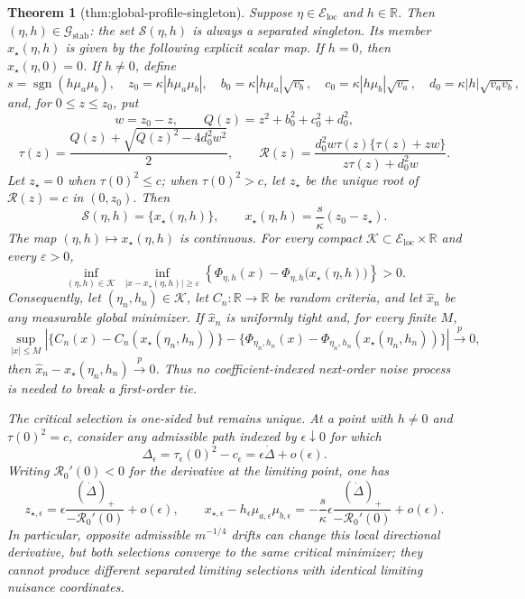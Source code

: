\documentclass{article}
\newtheorem{theorem}{Theorem}
\begin{document}
\begin{theorem}[thm:global-profile-singleton]\label{thm:global-profile-singleton}
Suppose \(\eta\in\mathcal E_{\mathrm{loc}}\) and \(h\in\mathbb R\).  Then \((\eta,h)\in\mathcal G_{\mathrm{stab}}\): the set \(\mathcal S(\eta,h)\) is always a separated singleton.  Its member \(x_\star(\eta,h)\) is given by the following explicit scalar map.  If \(h=0\), then \(x_\star(\eta,0)=0\).  If \(h\neq0\), define
\[
 s=\operatorname{sgn}(h\mu_a\mu_b),\quad
 z_0=\kappa|h\mu_a\mu_b|,\quad
 b_0=\kappa|h\mu_a|\sqrt{v_b},\quad
 c_0=\kappa|h\mu_b|\sqrt{v_a},\quad
 d_0=\kappa|h|\sqrt{v_av_b},
\]
and, for \(0\leq z\leq z_0\), put
\[
 w=z_0-z,\qquad Q(z)=z^2+b_0^2+c_0^2+d_0^2,
\]
\[
 \tau(z)=\frac{Q(z)+\sqrt{Q(z)^2-4d_0^2w^2}}{2},\qquad
 \mathcal R(z)=\frac{d_0^2w\tau(z)\{\tau(z)+zw\}}
 {z\tau(z)+d_0^2w}.
\]
Let \(z_\star=0\) when \(\tau(0)^2\leq c\); when \(\tau(0)^2>c\), let \(z_\star\) be the unique root of \(\mathcal R(z)=c\) in \((0,z_0)\).  Then
\[
 \mathcal S(\eta,h)=\{x_\star(\eta,h)\},\qquad
 x_\star(\eta,h)=\frac{s}{\kappa}(z_0-z_\star).
\]
The map \((\eta,h)\mapsto x_\star(\eta,h)\) is continuous.  For every compact \(\mathcal K\subset\mathcal E_{\mathrm{loc}}\times\mathbb R\) and every \(\varepsilon>0\),
\[
 \inf_{(\eta,h)\in\mathcal K}\ \inf_{|x-x_\star(\eta,h)|\geq\varepsilon}
 \left\{\Phi_{\eta,h}(x)-\Phi_{\eta,h}\bigl(x_\star(\eta,h)\bigr)\right\}>0. \tag{8}
\]
Consequently, let \((\eta_n,h_n)\in\mathcal K\), let \(C_n:\mathbb R\to\mathbb R\) be random criteria, and let \(\widehat x_n\) be any measurable global minimizer.  If \(\widehat x_n\) is uniformly tight and, for every finite \(M\),
\[
 \sup_{|x|\leq M}\left|
 \{C_n(x)-C_n(x_\star(\eta_n,h_n))\}
 -\{\Phi_{\eta_n,h_n}(x)-\Phi_{\eta_n,h_n}(x_\star(\eta_n,h_n))\}
 \right|\xrightarrow{p}0,
\]
then \(\widehat x_n-x_\star(\eta_n,h_n)\xrightarrow{p}0\).  Thus no coefficient-indexed next-order noise process is needed to break a first-order tie.

The critical selection is one-sided but remains unique.  At a point with \(h\neq0\) and \(\tau(0)^2=c\), consider any admissible path indexed by \(\epsilon\downarrow0\) for which
\[
 \Delta_\epsilon=\tau_\epsilon(0)^2-c_\epsilon
 =\epsilon\dot\Delta+o(\epsilon).
\]
Writing \(\mathcal R_0'(0)<0\) for the derivative at the limiting point, one has
\[
 z_{\star,\epsilon}
 =\epsilon\frac{(\dot\Delta)_+}{-\mathcal R_0'(0)}+o(\epsilon),
 \qquad
 x_{\star,\epsilon}-h_\epsilon\mu_{a,\epsilon}\mu_{b,\epsilon}
 =-\frac{s}{\kappa}\epsilon
 \frac{(\dot\Delta)_+}{-\mathcal R_0'(0)}+o(\epsilon).
\]
In particular, opposite admissible \(m^{-1/4}\) drifts can change this local directional derivative, but both selections converge to the same critical minimizer; they cannot produce different separated limiting selections with identical limiting nuisance coordinates.
\end{theorem}
\end{document}
